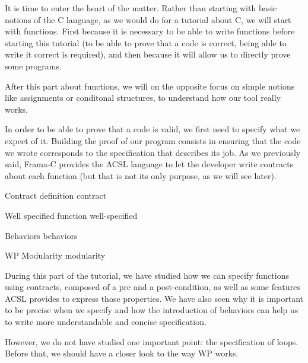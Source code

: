 It is time to enter the heart of the matter. Rather than starting with
basic notions of the C language, as we would do for a tutorial about C,
we will start with functions. First because it is necessary to be able
to write functions before starting this tutorial (to be able to prove
that a code is correct, being able to write it correct is required), and
then because it will allow us to directly prove some programs.



After this part about functions, we will on the opposite focus on simple
notions like assignments or conditonal structures, to understand how our
tool really works.



In order to be able to prove that a code is valid, we first need to
specify what we expect of it. Building the proof of our program consists
in ensuring that the code we wrote corresponds to the specification that
describes its job. As we previously said, Frama-C provides the ACSL
language to let the developer write contracts about each function (but
that is not its only purpose, as we will see later).



\begin{levelTwo}
  {Contract definition}
  {contract}
\end{levelTwo}

\begin{levelTwo}
  {Well specified function}
  {well-specified}
\end{levelTwo}

\begin{levelTwo}
  {Behaviors}
  {behaviors}
\end{levelTwo}

\begin{levelTwo}
  {WP Modularity}
  {modularity}
\end{levelTwo}


\horizontalLine



During this part of the tutorial, we have studied how we can specify
functions using contracts, composed of a pre and a post-condition, as
well as some features ACSL provides to express those properties. We have
also seen why it is important to be precise when we specify and how the
introduction of behaviors can help us to write more understandable and
concise specification.

However, we do not have studied one important point: the specification
of loops. Before that, we should have a closer look to the way WP works.
